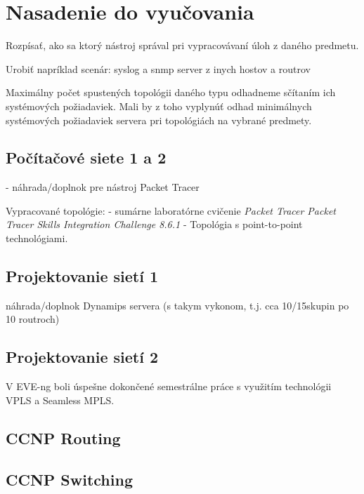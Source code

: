 \chapter{Nasadenie do vyučovania}

Rozpísať, ako sa ktorý nástroj správal pri vypracovávaní úloh z daného predmetu.

Urobiť napríklad scenár: syslog a snmp server z inych hostov a routrov

Maximálny počet spustených topológii daného typu odhadneme sčítaním ich systémových požiadaviek. Mali by z toho vyplynúť odhad minimálnych systémových požiadaviek servera pri topológiách na vybrané predmety.

\section{Počítačové siete 1 a 2}

- náhrada/doplnok pre nástroj Packet Tracer

Vypracované topológie:
- sumárne laboratórne cvičenie \emph{Packet Tracer Packet Tracer Skills Integration Challenge 8.6.1}
- Topológia s point-to-point technológiami.

\section{Projektovanie sietí 1}

náhrada/doplnok Dynamips servera (s takym vykonom, t.j. cca 10/15skupin po 10 routroch)

\section{Projektovanie sietí 2}

V EVE-ng boli úspešne dokončené semestrálne práce s využitím technológii VPLS a Seamless MPLS.

\section{CCNP Routing}

\section{CCNP Switching}